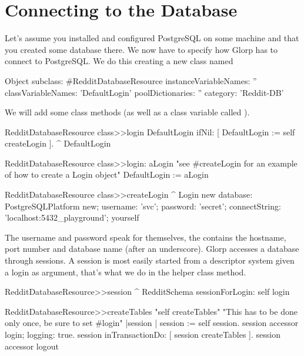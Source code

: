 \documentclass[a4paper,10pt,twoside]{book}
\begin{document}
\section{Connecting to the Database}

Let's assume you installed and configured PostgreSQL on some machine and that you created some database there. We now have to specify how Glorp has to connect to PostgreSQL. We do this creating a new class named 

\begin{code}{}
Object subclass: #RedditDatabaseResource
   instanceVariableNames: '' 
   classVariableNames: 'DefaultLogin' 
   poolDictionaries: '' 
   category: 'Reddit-DB'
\end{code}

We will add some class methods (as well as a class variable called ).

\begin{code}{}
RedditDatabaseResource class>>login
     DefaultLogin ifNil: [ DefaultLogin := self createLogin ]. 
     ^ DefaultLogin

RedditDatabaseResource class>>login: aLogin
     "see #createLogin for an example of how to create a Login object"      
     DefaultLogin := aLogin

RedditDatabaseResource class>>createLogin
     ^ Login new 
          database: PostgreSQLPlatform new; 
          username: 'svc'; 
          password: 'secret'; 
          connectString: 'localhost:5432_playground'; 
          yourself
\end{code}


The username and password speak for themselves, the  contains the hostname, port number and database name (after an underscore). Glorp accesses a database through sessions. A session is most easily started from a descriptor system given a login as argument, that's what we do in the  helper class method.


\begin{code}{}
RedditDatabaseResource>>session
     ^ RedditSchema sessionForLogin: self login

RedditDatabaseResource>>createTables
     "self createTables" 
     "This has to be done only once, be sure to set #login"
     |session | 
     session := self session. 
     session accessor login; logging: true. 
     session inTransactionDo: [ session createTables ]. 
     session accessor logout
\end{code}
\end{document}
